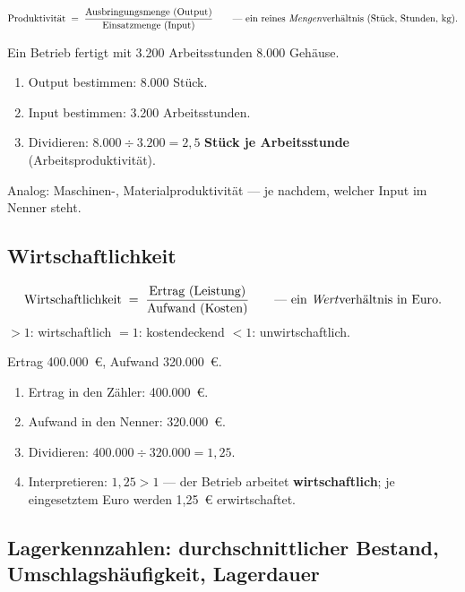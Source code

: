 \documentclass[11pt, a4paper]{article}
\begin{document}
\begin{merksatz}[title={\bfseries Formel: Produktivität}]
\[
\text{Produktivität} \;=\; \frac{\text{Ausbringungsmenge (Output)}}{\text{Einsatzmenge (Input)}}
\qquad \text{--- ein reines \emph{Mengen}verhältnis (Stück, Stunden, kg).}
\]
\end{merksatz}

\begin{beispiel}
Ein Betrieb fertigt mit 3.200 Arbeitsstunden 8.000 Gehäuse.
\begin{enumerate}
  \item Output bestimmen: 8.000 Stück.
  \item Input bestimmen: 3.200 Arbeitsstunden.
  \item Dividieren: $8.000 \div 3.200 = 2{,}5$ \textbf{Stück je Arbeitsstunde}
    (Arbeitsproduktivität).
\end{enumerate}
Analog: Maschinen-, Materialproduktivität --- je nachdem, welcher Input im Nenner steht.
\end{beispiel}

\subsection{Wirtschaftlichkeit}

\begin{merksatz}[title={\bfseries Formel: Wirtschaftlichkeit}]
\[
\text{Wirtschaftlichkeit} \;=\; \frac{\text{Ertrag (Leistung)}}{\text{Aufwand (Kosten)}}
\qquad \text{--- ein \emph{Wert}verhältnis in Euro.}
\]
$> 1$: wirtschaftlich \quad $= 1$: kostendeckend \quad $< 1$: unwirtschaftlich.
\end{merksatz}

\begin{beispiel}
Ertrag 400.000~€, Aufwand 320.000~€.
\begin{enumerate}
  \item Ertrag in den Zähler: 400.000~€.
  \item Aufwand in den Nenner: 320.000~€.
  \item Dividieren: $400.000 \div 320.000 = 1{,}25$.
  \item Interpretieren: $1{,}25 > 1$ --- der Betrieb arbeitet \textbf{wirtschaftlich};
    je eingesetztem Euro werden 1,25~€ erwirtschaftet.
\end{enumerate}
\end{beispiel}

\subsection{Lagerkennzahlen: durchschnittlicher Bestand, Umschlagshäufigkeit, Lagerdauer}
\end{document}
